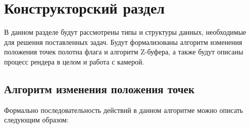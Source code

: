\chapter{Конструкторский раздел}

\vspace{-0.5cm}\hspace{0.6cm}В данном разделе будут рассмотрены типы и структуры данных, необходимые для решения поставленных задач. Будут формализованы алгоритм изменения положения точек полотна флага и алгоритм Z-буфера, а также будут описаны процесс рендера в целом и работа с камерой.

\section{Алгоритм изменения положения точек}
Формально последовательность действий в данном алгоритме можно описать следующим образом:

